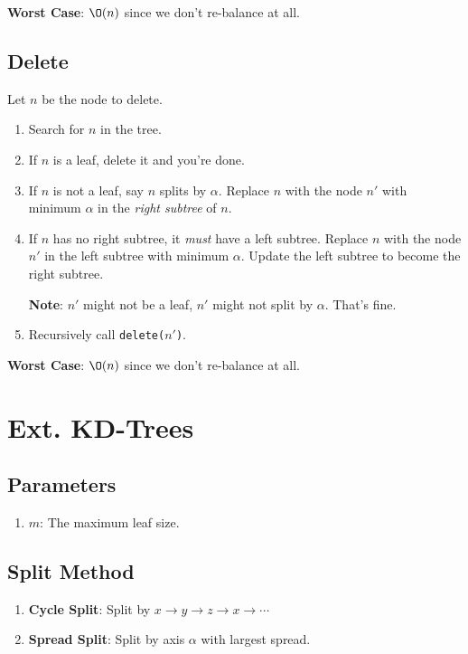 \documentclass[12pt, letterpaper]{article}
\begin{document}
\begin{multicols*}{3}
        {\bf Worst Case}: $\O(n)$ since we don't re-balance at all.

        \subsection{Delete}
        Let $n$ be the node to delete.
        \begin{enumerate}
            \item Search for $n$ in the tree.
            \item If $n$ is a leaf, delete it and you're done.
            
            \item If $n$ is not a leaf, say $n$ splits by $\alpha$. Replace $n$ with the node $n'$ with minimum $\alpha$ in the {\it right subtree} of $n$.
            \item If $n$ has no right subtree, it {\it must} have a left subtree. Replace $n$ with the node $n'$ in the left subtree with minimum $\alpha$. Update the left subtree to become the right subtree.
            
            {\bf Note}: $n'$ might not be a leaf, $n'$ might not split by $\alpha$. That's fine.
            
            \item Recursively call \texttt{delete($n'$)}.
        \end{enumerate}

        {\bf Worst Case}: $\O(n)$ since we don't re-balance at all.

        \section{Ext. KD-Trees}

        \subsection{Parameters}
        \begin{enumerate}
            \item $m$: The maximum leaf size.
        \end{enumerate}

        \subsection{Split Method}
        \begin{enumerate}
            \item {\bf Cycle Split}: Split by $x \to y \to z \to x \to \cdots$
            \item {\bf Spread Split}: Split by axis $\alpha$ with largest spread.
        \end{enumerate}
        

\end{multicols*}
\end{document}
